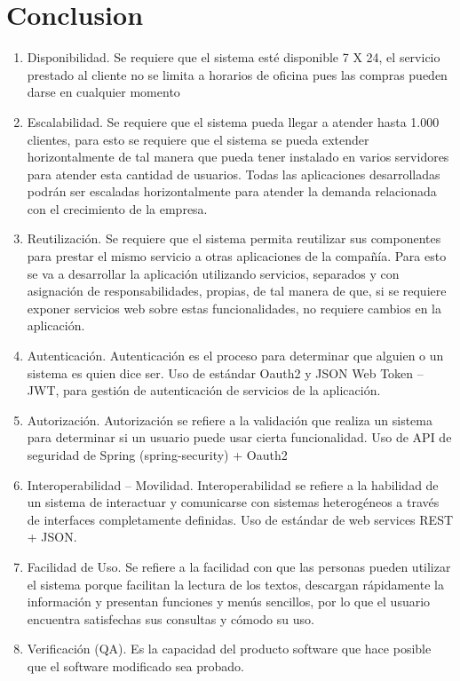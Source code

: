 \documentclass[
  journal=large,
  manuscript=propuesta,
  year=2020,
  volume=37,
]{cup-journal}
\def\tightlist{}
\begin{document}
\section{Conclusion}
\begin{enumerate}
\def\labelenumi{\arabic{enumi}.}
\tightlist
\item
  Disponibilidad. Se requiere que el sistema esté disponible 7 X 24, el
  servicio prestado al cliente no se limita a horarios de oficina pues
  las compras pueden darse en cualquier momento
\item
  Escalabilidad. Se requiere que el sistema pueda llegar a atender hasta
  1.000 clientes, para esto se requiere que el sistema se pueda extender
  horizontalmente de tal manera que pueda tener instalado en varios
  servidores para atender esta cantidad de usuarios. Todas las
  aplicaciones desarrolladas podrán ser escaladas horizontalmente para
  atender la demanda relacionada con el crecimiento de la empresa.
\item
  Reutilización. Se requiere que el sistema permita reutilizar sus
  componentes para prestar el mismo servicio a otras aplicaciones de la
  compañía. Para esto se va a desarrollar la aplicación utilizando
  servicios, separados y con asignación de responsabilidades, propias,
  de tal manera de que, si se requiere exponer servicios web sobre estas
  funcionalidades, no requiere cambios en la aplicación.
\item
  Autenticación. Autenticación es el proceso para determinar que alguien
  o un sistema es quien dice ser. Uso de estándar Oauth2 y JSON Web
  Token -- JWT, para gestión de autenticación de servicios de la
  aplicación.
\item
  Autorización. Autorización se refiere a la validación que realiza un
  sistema para determinar si un usuario puede usar cierta funcionalidad.
  Uso de API de seguridad de Spring (spring-security) + Oauth2
\item
  Interoperabilidad -- Movilidad. Interoperabilidad se refiere a la
  habilidad de un sistema de interactuar y comunicarse con sistemas
  heterogéneos a través de interfaces completamente definidas. Uso de
  estándar de web services REST + JSON.
\item
  Facilidad de Uso. Se refiere a la facilidad con que las personas
  pueden utilizar el sistema porque facilitan la lectura de los textos,
  descargan rápidamente la información y presentan funciones y menús
  sencillos, por lo que el usuario encuentra satisfechas sus consultas y
  cómodo su uso.
\item
  Verificación (QA). Es la capacidad del producto software que hace
  posible que el software modificado sea probado.
\end{enumerate}
\end{document}
